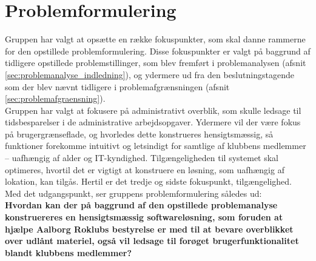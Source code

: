 \section{Problemformulering}
Gruppen har valgt at opsætte en række fokuspunkter, som skal danne rammerne for den opstillede problemformulering. Disse fokuspunkter er valgt på baggrund af tidligere opstillede problemstillinger, som blev fremført i problemanalysen (afsnit \ref{sec:problemanalyse_indledning}), og ydermere ud fra den beslutningstagende som der blev nævnt tidligere i problemafgrænsningen (afsnit \ref{sec:problemafgraensning}). \\

Gruppen har valgt at fokusere på administrativt overblik, som skulle ledsage til tidsbesparelser i de administrative arbejdsopgaver. Ydermere vil der være fokus på brugergrænseflade, og hvorledes dette konstrueres hensigtsmæssig, så funktioner forekomme intuitivt og letsindigt for samtlige af klubbens medlemmer – uafhængig af alder og IT-kyndighed. Tilgængeligheden til systemet skal optimeres, hvortil det er vigtigt at konstruere en løsning, som uafhængig af lokation, kan tilgås. Hertil er det tredje og sidste fokuspunkt, tilgængelighed. \\

Med det udgangspunkt, ser gruppens problemformulering således ud: \\

\textbf{Hvordan kan der på baggrund af den opstillede problemanalyse konstruereres en hensigtsmæssig softwareløsning, som foruden at hjælpe Aalborg Roklubs bestyrelse er med til at bevare overblikket over udlånt materiel, også vil ledsage til forøget brugerfunktionalitet blandt klubbens medlemmer?}

